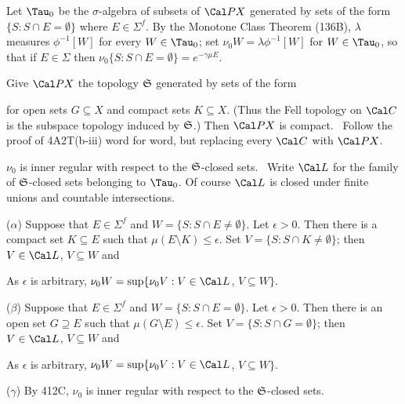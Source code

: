 {Let $\Tau_0$ be the $\sigma$-algebra of subsets of $\Cal PX$
generated by sets of the form $\{S:S\cap E=\emptyset\}$ where
$E\in\Sigma^f$.   By the Monotone Class Theorem (136B),
$\lambda$ measures $\phi^{-1}[W]$ for every
$W\in\Tau_0$;  set $\nu_0W=\lambda\phi^{-1}[W]$ for $W\in\Tau_0$, so that
if $E\in\Sigma$ then $\nu_0\{S:S\cap E=\emptyset\}=e^{-\gamma\mu E}$.

\medskip

 Give $\Cal PX$ the topology $\frak S$ generated by sets of
the form


\noindent for open sets $G\subseteq X$ and compact sets $K\subseteq X$.
(Thus the Fell topology on $\Cal C$ is the subspace topology induced by
$\frak S$.)   Then $\Cal PX$ is compact.   \Prf\ Follow the proof of
4A2T(b-iii) word for word, but replacing every $\Cal C$ with $\Cal PX$.\
\Qed

\medskip

 $\nu_0$ is inner regular with respect to the
$\frak S$-closed sets.   \Prf\ Write $\Cal L$ for the family of
$\frak S$-closed sets belonging to $\Tau_0$.   Of course $\Cal L$ is closed
under finite unions and countable intersections.

($\alpha$) Suppose that $E\in\Sigma^f$ and
$W=\{S:S\cap E\ne\emptyset\}$.   Let $\epsilon>0$.   Then there is a
compact set $K\subseteq E$ such that $\mu(E\setminus K)\le\epsilon$.
Set $V=\{S:S\cap K\ne\emptyset\}$;  then $V\in\Cal L$, $V\subseteq W$ and


\noindent As $\epsilon$ is arbitrary,
$\nu_0W=\sup\{\nu_0V:V\in\Cal L$, $V\subseteq W\}$.

($\beta$) Suppose that $E\in\Sigma^f$ and
$W=\{S:S\cap E=\emptyset\}$.   Let $\epsilon>0$.   Then there is an
open set $G\supseteq E$ such that $\mu(G\setminus E)\le\epsilon$.
Set $V=\{S:S\cap G=\emptyset\}$;  then $V\in\Cal L$, $V\subseteq W$ and


\noindent As $\epsilon$ is arbitrary,
$\nu_0W=\sup\{\nu_0V:V\in\Cal L$, $V\subseteq W\}$.

($\gamma$) By 412C, $\nu_0$ is inner regular with respect to the
$\frak S$-closed sets.\ \Qed

}
